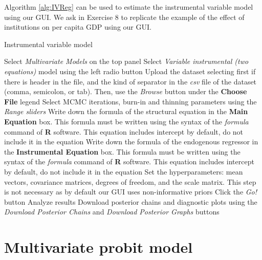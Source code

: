 Algorithm \ref{alg:IVReg} can be used to estimate the instrumental variable model using our GUI. We ask in Exercise 8 to replicate the example of the effect of institutions on per capita GDP using our GUI.  

\begin{algorithm}[h!]
	\caption{Instrumental variable model}\label{alg:IVReg}
	\begin{algorithmic}[1]  		 			
		\State Select \textit{Multivariate Models} on the top panel
		\State Select \textit{Variable instrumental (two equations)} model using the left radio button
		\State Upload the dataset selecting first if there is header in the file, and the kind of separator in the \textit{csv} file of the dataset (comma, semicolon, or tab). Then, use the \textit{Browse} button under the \textbf{Choose File} legend
		\State Select MCMC iterations, burn-in and thinning parameters using the \textit{Range sliders}
		\State Write down the formula of the structural equation in the \textbf{Main Equation} box. This formula must be written using the syntax of the \textit{formula} command of \textbf{R} software. This equation includes intercept by default, do not include it in the equation
		\State Write down the formula of the endogenous regressor in the \textbf{Instrumental Equation} box. This formula must be written using the syntax of the \textit{formula} command of \textbf{R} software. This equation includes intercept by default, do not include it in the equation
		\State Set the hyperparameters: mean vectors, covariance matrices, degrees of freedom, and the scale matrix. This step is not necessary as by default our GUI uses non-informative priors
		\State Click the \textit{Go!} button
		\State Analyze results
		\State Download posterior chains and diagnostic plots using the \textit{Download Posterior Chains} and \textit{Download Posterior Graphs} buttons
	\end{algorithmic} 
\end{algorithm}

\section{Multivariate probit model}\label{sec74}

